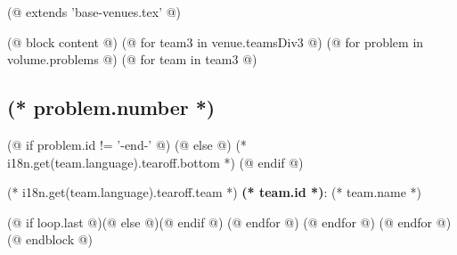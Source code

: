(@ extends 'base-venues.tex' @)

(@ block content @)
    \pagestyle{tearoff}    
    (@ for team3 in venue.teamsDiv3 @)
        (@ for problem in volume.problems @)
            (@ for team in team3 @)%
                \setcounter{volume}{(* volume.number *)}%
                \setcounter{problem}{(* problem.number *)}%
                \setcounter{team}{(* team.id *)}%

                \begin{minipage}[t][96mm][t]{\textwidth}%
                    \begin{minipage}[t][88mm][t]{0.85\linewidth}%
                        \vspace{0pt}%
                        \subsection{\texorpdfstring{(* problem.number *)}{(* problem.number *). (* problem.id *)}}%
                        \setlength{\parskip}{6pt}
                        (@ if problem.id != '-end-' @)
                        (@ else @)
                            (* i18n.get(team.language).tearoff.bottom *)
                        (@ endif @)
                    \end{minipage}%
                    \begin{minipage}[t][88mm][t]{0.15\linewidth}
                        \vspace{0mm}%
                        \hspace{4mm}%
                        \hspace{2pt}
                    \end{minipage}
                    {\small (* i18n.get(team.language).tearoff.team *) \textbf{(* team.id *)}: (* team.name *)}
                \end{minipage}%
                (@ if loop.last @)\newpage(@ else @)\vspace*{-1mm}(@ endif @)
            (@ endfor @)
        (@ endfor @)
    (@ endfor @)
(@ endblock @)
